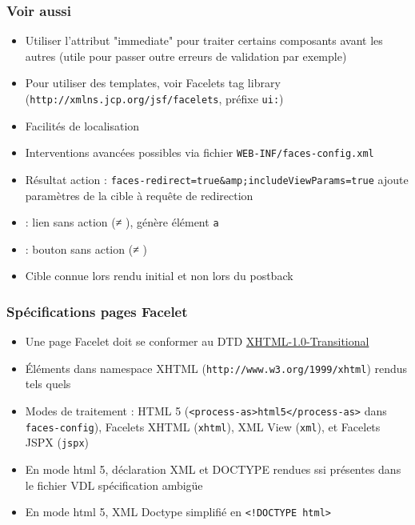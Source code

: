 \documentclass[english, french]{beamer}
\begin{document}
\begin{frame}
	\frametitle{Voir aussi}
	\begin{itemize}
		\item Utiliser l’attribut "immediate" pour traiter certains composants avant les autres (utile pour passer outre erreurs de validation par exemple)
		\item Pour utiliser des templates, voir Facelets tag library (\texttt{http://xmlns.jcp.org/jsf/facelets}, préfixe \texttt{ui:}) %
		\item Facilités de localisation
		\item Interventions avancées possibles via fichier \texttt{WEB-INF/faces-config.xml}
		\item Résultat action : {\texttt{faces-redirect=true\&amp;includeViewParams=true}} ajoute paramètres de la cible à requête de redirection
		\item {} : lien sans action ({≠} ), génère élément \texttt{a}
		\item {} : bouton sans action ({≠} )
		\item Cible connue lors rendu initial {\tiny et non lors du postback}
	\end{itemize}
\end{frame}

\begin{frame}
	\frametitle{Spécifications pages Facelet}
	\begin{itemize}
		\item Une page Facelet doit se conformer au DTD \href{http://www.w3.org/TR/xhtml1/\#a\_dtd\_XHTML-1.0-Transitional}{XHTML-1.0-Transitional}
		\item Éléments dans namespace XHTML {\tiny (\texttt{http://www.w3.org/1999/xhtml})} rendus tels quels
		\item Modes de traitement : HTML 5 (\texttt{<process-as>html5</process-as>} dans \texttt{faces-config}), Facelets XHTML (\texttt{xhtml}), XML View (\texttt{xml}), et Facelets JSPX (\texttt{jspx})
		\item En mode html 5, déclaration XML et DOCTYPE rendues ssi présentes dans le fichier VDL {\tiny spécification ambigüe}
		\item En mode html 5, XML Doctype simplifié en \texttt{<!DOCTYPE html>}
	\end{itemize}
\end{frame}
\end{document}
